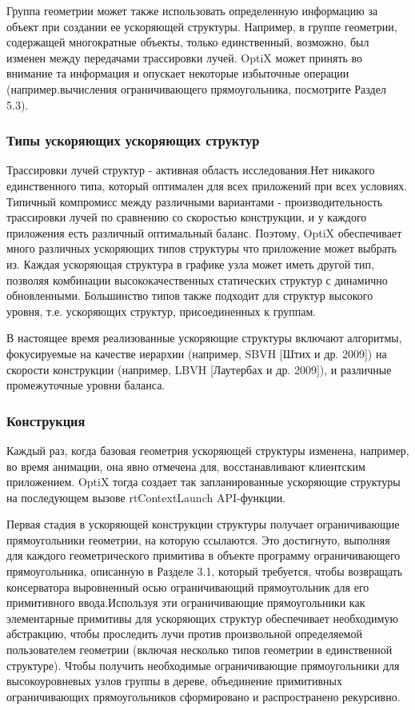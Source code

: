   Группа геометрии может также использовать определенную информацию за объект при создании ее ускоряющей структуры. Например, в группе геометрии, содержащей многократные объекты, только единственный, возможно, был изменен между передачами трассировки лучей. OptiX может принять во внимание та информация и опускает некоторые избыточные операции (например.вычисления ограничивающего прямоугольника, посмотрите Раздел 5.3).
\subsubsection{Типы ускоряющих ускоряющих структур}
 Трассировки лучей структур - активная область исследования.Нет никакого единственного типа, который оптимален для всех приложений при всех условиях. Типичный компромисс между различными вариантами - производительность трассировки лучей по сравнению со скоростью конструкции, и у каждого приложения есть различный оптимальный баланс. Поэтому, OptiX обеспечивает много различных ускоряющих типов структуры что приложение может выбрать из. Каждая ускоряющая структура в графике узла может иметь другой тип, позволяя комбинации высококачественных статических структур с динамично обновленными. Большинство типов также подходит для структур высокого уровня, т.е. ускоряющих структур, присоединенных к группам.

В настоящее время реализованные ускоряющие структуры включают алгоритмы, фокусируемые на качестве иерархии (например, SBVH [Штих и др. 2009]) на скорости конструкции (например, LBVH [Лаутербах и др. 2009]), и различные промежуточные уровни баланса.
\subsubsection{Конструкция}
Каждый раз, когда базовая геометрия ускоряющей структуры изменена, например, во время анимации, она явно отмечена для, восстанавливают клиентским приложением. OptiX тогда создает так запланированные ускоряющие структуры на последующем вызове rtContextLaunch API-функции. 

Первая стадия в ускоряющей конструкции структуры получает ограничивающие прямоугольники геометрии, на которую ссылаются. Это достигнуто, выполняя для каждого геометрического примитива в объекте программу ограничивающего прямоугольника, описанную в Разделе 3.1, который требуется, чтобы возвращать консерватора выровненный осью ограничивающий прямоугольник для его примитивного ввода.Используя эти ограничивающие прямоугольники как элементарные примитивы для ускоряющих структур обеспечивает необходимую абстракцию, чтобы проследить лучи против произвольной определяемой пользователем геометрии (включая несколько типов геометрии в единственной структуре). Чтобы получить необходимые ограничивающие прямоугольники для высокоуровневых узлов группы в дереве, объединение примитивных ограничивающих прямоугольников сформировано и распространено рекурсивно.

